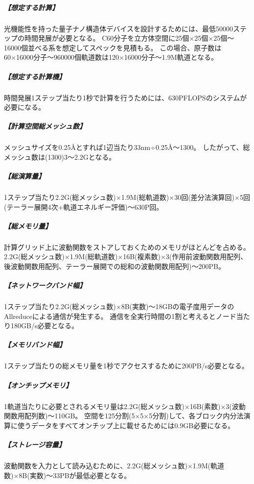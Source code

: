 \subparagraph{【想定する計算】}
光機能性を持った量子ナノ構造体デバイスを設計するためには、最低50000ステップの時間発展が必要となる。
C60分子を立方体空間に25個×25個×25個～16000個並べる系を想定してスペックを見積もる。
この場合、原子数は60×16000分子～960000個軌道数は120×16000分子～1.9M軌道となる。

\subparagraph{【想定する計算機】}
時間発展1ステップ当たり1秒で計算を行うためには、630PFLOPSのシステムが必要になる。

\subparagraph{【計算空間総メッシュ数】}
メッシュサイズを0.25Åとすれば1辺当たり33nm÷0.25Å～1300。
したがって、総メッシュ数は(1300)3～2.2Gとなる。

\subparagraph{【総演算量】}
1ステップ当たり2.2G(総メッシュ数)×1.9M(総軌道数)×30回(差分法演算回)×5回(テーラー展開4次+軌道エネルギー評価)～630P回。

\subparagraph{【総メモリ量】}
計算グリッド上に波動関数をストアしておくためのメモリがほとんどを占める。
2.2G(総メッシュ数)×1.9M(総軌道数)×16B(複素数)×3(作用前波動関数用配列、後波動関数用配列、テーラー展開での総和の波動関数用配列)～200PB。

\subparagraph{【ネットワークバンド幅】}
1ステップ当たり2.2G(総メッシュ数)×8B(実数)～18GBの電子度用データのAllreduceによる通信が発生する。
通信を全実行時間の1割と考えるとノード当たり180GB/s必要となる。

\subparagraph{【メモリバンド幅】}
1ステップ当たりの総メモリ量を1秒でアクセスするために200PB/s必要となる。

\subparagraph{【オンチップメモリ】}
1軌道当たりに必要とされるメモリ量は2.2G(総メッシュ数)×16B(素数)×3(波動関数用配列数)～110GB。
空間を125分割(5×5×5分割)して、各ブロック内分法演算に使うデータをすべてオンチップ上に載せるためには0.9GB必要になる。

\subparagraph{【ストレージ容量】}
波動関数を入力として読み込むために、2.2G(総メッシュ数)×1.9M(軌道数)×8B(実数)～33PBが最低必要となる。

\clearpage
